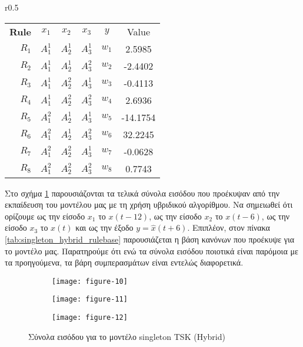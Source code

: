 \documentclass[11pt,a4paper,titlepage, oneside]{article}
\newlength\figureheight
\newlength\figurewidth
\begin{document}
			\begin{wraptable}{r}{0.5\textwidth}
				\vspace{-12pt}
				\centering
				\begin{tabular}[b]{r c c c||c|c}
					\bfseries{Rule} & $x_1$ & $x_2$ & $x_3$ & $y$ & Value\\ \hhline{====||=|=}
					$R_{1}$ & $A_1^1$ & $A_2^1$ & $A_3^1$ & $w_1$ & 2.5985 \\
					$R_{2}$ & $A_1^1$ & $A_2^1$ & $A_3^2$ & $w_2$ & -2.4402 \\
					$R_{3}$ & $A_1^1$ & $A_2^2$ & $A_3^1$ & $w_3$ & -0.4113 \\
					$R_{4}$ & $A_1^1$ & $A_2^2$ & $A_3^2$ & $w_4$ & 2.6936 \\
					$R_{5}$ & $A_1^2$ & $A_2^1$ & $A_3^1$ & $w_5$ & -14.1754 \\
					$R_{6}$ & $A_1^2$ & $A_2^1$ & $A_3^2$ & $w_6$ & 32.2245 \\			
					$R_{7}$ & $A_1^2$ & $A_2^2$ & $A_3^1$ & $w_7$ & -0.0628 \\
					$R_{8}$ & $A_1^2$ & $A_2^2$ & $A_3^2$ & $w_8$ & 0.7743 \\
				\end{tabular}
				\caption{Ασαφής βάση κανόνων για το μοντέλο singleton TSK (Hybrid)}
				\label{tab:singleton_hybrid_rulebase}
			\end{wraptable}

			Στο σχήμα \ref{fig:singleton_bp_input_sets} παρουσιάζονται τα τελικά σύνολα εισόδου που προέκυψαν από την εκπαίδευση του μοντέλου μας με τη χρήση υβριδικού αλγορίθμου. Να σημειωθεί ότι ορίζουμε ως την είσοδο $x_1$ το $x(t-12)$, ως την είσοδο $x_2$ το $x(t-6)$, ως την είσοδο $x_3$ το $x(t)$ και ως την έξοδο $y = \hat{x}(t+6)$. Επιπλέον, στον πίνακα \ref{tab:singleton_hybrid_rulebase} παρουσιάζεται η βάση κανόνων που προέκυψε για το μοντέλο μας. Παρατηρούμε ότι ενώ τα σύνολα εισόδου ποιοτικά είναι παρόμοια με τα προηγούμενα, τα βάρη συμπερασμάτων είναι εντελώς διαφορετικά.
						
			\clearpage

						
			\begin{figure}
			 	\setlength{}
				\setlength{}	
				\centering
				\begin{subfigure}[b]{0.32\textwidth}
					\texttt{[image: figure-10]}
				\end{subfigure}
				\begin{subfigure}[b]{0.32\textwidth}
					\texttt{[image: figure-11]}
				\end{subfigure}
				\begin{subfigure}[b]{0.32\textwidth}
					\texttt{[image: figure-12]}
				\end{subfigure}
				\caption{Σύνολα εισόδου για το μοντέλο singleton TSK (Hybrid)}
				\label{fig:singleton_bp_input_sets}
			\end{figure}
		
\end{document}
